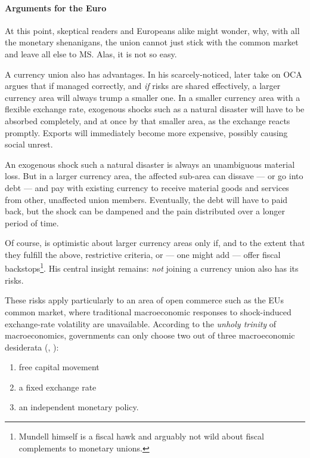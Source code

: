 \documentclass[11pt,a4paper,oneside,openright]{article}
\begin{document}

\paragraph{Arguments for the Euro} At this point, skeptical readers and Europeans alike might wonder, why, with all the monetary shenanigans, the union cannot just stick with the common market and leave all else to \gls{MS}. 
Alas, it is not so easy.

A currency union also has advantages. 
In his scarcely-noticed, later take on \gls{OCA} \cite{Mundell1972} argues that if managed correctly, and \emph{if} risks are shared effectively, a larger currency area will always trump a smaller one. 
In a smaller currency area with a flexible exchange rate, exogenous shocks such as a natural disaster will have to be absorbed completely, and at once by that smaller area, as the exchange reacts promptly. 
Exports will immediately become more expensive, possibly causing social unrest.

An exogenous shock such a natural disaster is always an unambiguous material loss. 
But in a larger currency area, the affected sub-area can dissave --- or go into debt --- and pay with existing currency to receive material goods and services from other, unaffected union members. 
Eventually, the debt will have to paid back, but the shock can be dampened and the pain distributed over a longer period of time.

Of course, \cite{Mundell1972} is optimistic about larger currency areas only if, and to the extent that they fulfill the above, restrictive criteria, or --- one might add --- offer fiscal backstops\footnote{
	Mundell himself is a fiscal hawk and arguably not wild about fiscal complements to monetary unions.}.
His central insight remains: 
\emph{not} joining a currency union also has its risks.

These risks apply particularly to an area of open commerce such as the \gls{EU}s common market, where traditional macroeconomic responses to shock-induced exchange-rate volatility are unavailable. 
According to the \emph{unholy trinity} of macroeconomics, governments can only choose two out of three macroeconomic desiderata (\citealt{Mundell1963}, \citealt{Fleming1962}):
\begin{enumerate}
	\item free capital movement
	\item a fixed exchange rate
	\item an independent monetary policy.
\end{enumerate}
\end{document}
